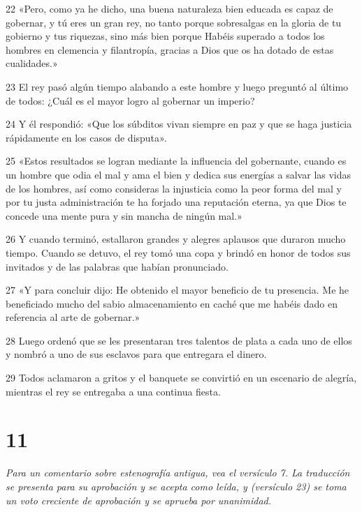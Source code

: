 \par 22 «Pero, como ya he dicho, una buena naturaleza bien educada es capaz de gobernar, y tú eres un gran rey, no tanto porque sobresalgas en la gloria de tu gobierno y tus riquezas, sino más bien porque Habéis superado a todos los hombres en clemencia y filantropía, gracias a Dios que os ha dotado de estas cualidades.»

\par 23 El rey pasó algún tiempo alabando a este hombre y luego preguntó al último de todos: ¿Cuál es el mayor logro al gobernar un imperio?

\par 24 Y él respondió: «Que los súbditos vivan siempre en paz y que se haga justicia rápidamente en los casos de disputa».

\par 25 «Estos resultados se logran mediante la influencia del gobernante, cuando es un hombre que odia el mal y ama el bien y dedica sus energías a salvar las vidas de los hombres, así como consideras la injusticia como la peor forma del mal y por tu justa administración te ha forjado una reputación eterna, ya que Dios te concede una mente pura y sin mancha de ningún mal.»

\par 26 Y cuando terminó, estallaron grandes y alegres aplausos que duraron mucho tiempo. Cuando se detuvo, el rey tomó una copa y brindó en honor de todos sus invitados y de las palabras que habían pronunciado.

\par 27 «Y para concluir dijo: He obtenido el mayor beneficio de tu presencia. Me he beneficiado mucho del sabio almacenamiento en caché que me habéis dado en referencia al arte de gobernar.»

\par 28 Luego ordenó que se les presentaran tres talentos de plata a cada uno de ellos y nombró a uno de sus esclavos para que entregara el dinero.

\par 29 Todos aclamaron a gritos y el banquete se convirtió en un escenario de alegría, mientras el rey se entregaba a una continua fiesta.

\chapter{11}

\par \textit{Para un comentario sobre estenografía antigua, vea el versículo 7. La traducción se presenta para su aprobación y se acepta como leída, y (versículo 23) se toma un voto creciente de aprobación y se aprueba por unanimidad.}

